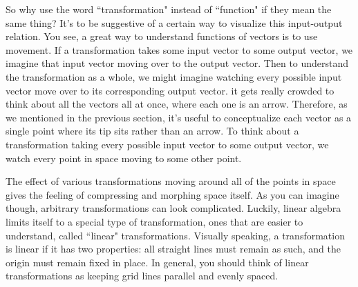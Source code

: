 \begin{bookfigure}
\end{bookfigure}

So why use the word ``transformation" instead of ``function" if they mean the
same thing? It's to be suggestive of a certain way to visualize this
input-output relation. You see, a great way to understand functions of vectors
is to use movement. If a transformation takes some input vector to some output
vector, we imagine that input vector moving over to the output vector. Then to
understand the transformation as a whole, we might imagine watching every
possible input vector move over to its corresponding output vector. it gets
really crowded to think about all the vectors all at once, where each one is an
arrow. Therefore, as we mentioned in the previous section, it's useful to
conceptualize each vector as a single point where its tip sits rather than an
arrow. To think about a transformation taking every possible input vector to
some output vector, we watch every point in space moving to some other point.

The effect of various transformations moving around all of the points in space
gives the feeling of compressing and morphing space itself. As you can imagine
though, arbitrary transformations can look complicated. Luckily, linear algebra
limits itself to a special type of transformation, ones that are easier to
understand, called ``linear" transformations. Visually speaking, a
transformation is linear if it has two properties: all straight lines must
remain as such, and the origin must remain fixed in place. In general, you
should think of linear transformations as keeping grid lines parallel and evenly
spaced.

